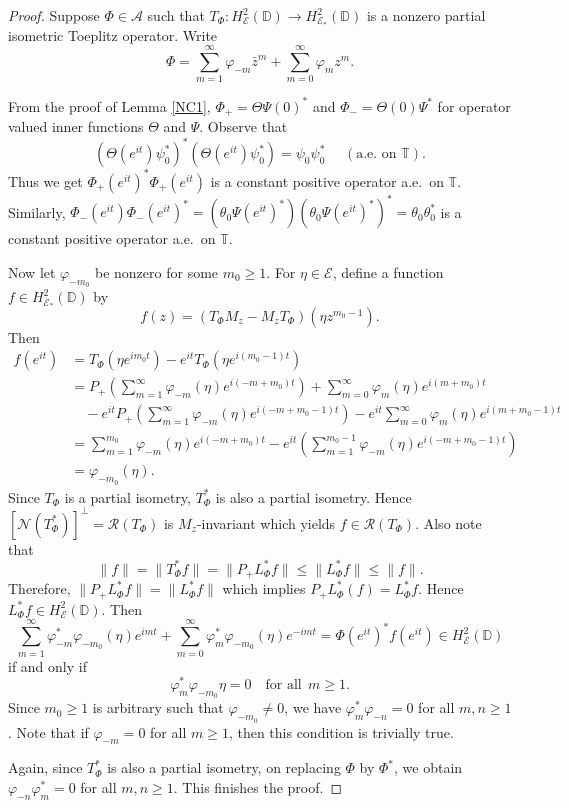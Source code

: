 \documentclass[12pt]{amsart}
\newcommand{\cla}{\mathcal{A}}
\newcommand{\cle}{\mathcal{E}}
\newcommand{\cln}{\mathcal{N}}
\newcommand{\clr}{\mathcal{R}}
\newcommand{\D}{\mathbb{D}}
\newcommand{\T}{\mathbb{T}}
\theoremstyle{definition}
\theoremstyle{plain}
\theoremstyle{definition}
\numberwithin{equation}{section}
\let\phi=\varphi
\begin{document}
\begin{proof}
Suppose $\Phi \in \cla$ such that $T_\Phi: H^2_\cle(\D) \rightarrow H^2_{\cle_*}(\D)$ is a nonzero partial isometric Toeplitz operator.
Write
\begin{equation}\label{eq 6}
\Phi= \sum\limits_{m=1}^\infty  \phi_{-m}\bar{z}^m +\sum\limits_{m=0}^\infty \phi_mz^{m}.
\end{equation}


From the proof of Lemma \ref{NC1}, $\Phi_+=\Theta\Psi(0)^*$ and $\Phi_-=\Theta(0)\Psi^*$ for operator valued inner functions $\Theta$ and $\Psi$. Observe that
\[
(\Theta(e^{it}) \psi_0^*)^*(\Theta(e^{it}) \psi_0^*)=\psi_0\psi_0^* \,\, \quad(\text{a.e.\ on } \T).
\]
Thus we get $\Phi_+(e^{it})^*\Phi_+(e^{it}) $ is a constant positive operator a.e.\ on $\T$. Similarly,  $\Phi_-(e^{it})\Phi_-(e^{it})^*=(\theta_0 \Psi(e^{it})^*)(\theta_0 \Psi(e^{it})^*)^* = \theta_0 \theta_0^*$ is a constant positive operator a.e.\ on 
$\T$. 

Now let $\phi_{-m_0}$ be nonzero for some $m_0 \geq 1$. For $\eta \in \cle$, define a function $f\in H^2_{\cle_*}(\D)$ by 
\[
f(z)=(T_\Phi M_z-M_zT_\Phi)\left(\eta z^{m_0-1}\right).
\]
Then 
\begin{align*}
f(e^{it})&=T_\Phi(\eta e^{im_0t})-e^{it}T_\Phi(\eta e^{i(m_0-1)t})\\
&=P_+\left(\sum\limits_{m=1}^\infty \phi_{-m}(\eta)e^{i(-m+m_0)t}\right)+\sum\limits_{m=0}^\infty \phi_m(\eta)e^{i(m+m_0)t} \\
& \quad -e^{it}P_+\left(\sum\limits_{m=1}^\infty \phi_{-m}(\eta)e^{i(-m+m_0-1)t}\right) - e^{it}\sum\limits_{m=0}^\infty \phi_{m}(\eta)e^{i(m+m_0-1)t}\\
&=\sum\limits_{m=1}^{m_0} \phi_{-m}(\eta)e^{i(-m+m_0)t}-e^{it}\left(\sum\limits_{m=1}^{m_0-1}\phi_{-m}(\eta)e^{i(-m+m_0-1)t}\right)\\
&=\phi_{-m_0}(\eta).
\end{align*}
Since $T_\Phi$ is a partial isometry, $T_\Phi^*$  is also a partial isometry. 
Hence $[\cln(T_\Phi^*)]^\perp=\clr(T_\Phi)$ is $M_z$-invariant which yields $f \in \clr(T_\Phi)$.
Also note that 
\[
\|f\|=\|T_\Phi^*f\|=\|P_+L_\Phi ^*f\|\leq \|L_\Phi^* f \|\leq \|f\|.
\]
Therefore, $\|P_+L_\Phi ^*f \|=\|L_\Phi^* f \|$ which implies $P_+ L_\Phi^* (f)=L_\Phi^*f$. Hence $L_\Phi^* f \in H^2_\cle(\D)$. Then
\[
\sum\limits_{m=1}^\infty \phi_{-m}^*\phi_{-m_0}(\eta)e^{imt}+\sum\limits_{m=0}^\infty \phi_m^*\phi_{-m_0}(\eta)e^{-imt} = \Phi(e^{it})^*f(e^{it})\in H^2_\cle(\D)
\]
if and only if 
\[
\phi_m^*\phi_{-m_0}\eta=0 \quad \mbox{for all} ~~ m \geq 1.
\]
Since $m_0 \geq 1$ is arbitrary such that $\phi_{-m_0} \neq 0$, we have $\phi_m^*\phi_{-n}=0 $ for all $m,n \geq 1$. Note that if $\phi_{-m}=0$ for all $m \geq 1$, then this condition is trivially true. 

Again, since $T_\Phi^*$ is also a partial isometry, on replacing $\Phi$ by $\Phi^*$, we obtain $\phi_{-n}\phi_m^*=0$ for all $m ,n \geq 1$. This finishes the proof.
\end{proof}
\end{document}
